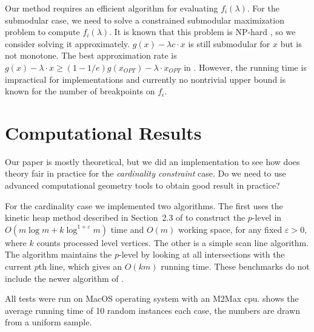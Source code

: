 \documentclass{article}
\begin{document}
Our method requires an efficient algorithm for evaluating $f_i(\lambda)$.
For the submodular case, we need to solve a constrained submodular maximization problem to compute $f_i(\lambda)$. 
It is known that this problem is NP-hard \cite{calinescu_maximizing_2011}, so we consider solving it approximately. $g(x)-\lambda c\cdot x$ is still submodular for $x$ but is not monotone. 
The best approximation rate is $g(x)-\lambda \cdot x \geq (1-1/e)g(x_{OPT})-\lambda \cdot x_{OPT}$ in \cite{sviridenko_optimal_2017}.
However, the running time is impractical for implementations and currently no nontrivial upper bound is known for the number of breakpoints on $f_i$.


\section{Computational Results}
Our paper is mostly theoretical, but we did an implementation to see how does theory fair in practice for the \emph{cardinality constraint} case. Do we need to use advanced computational geometry tools to obtain good result in practice?

For the cardinality case we implemented two algorithms. The first uses the kinetic heap method described in Section~2.3 of \cite{Chan1999RemarksOK} to construct the $p$-level in $O(m\log m+k\log^{1+\varepsilon}m)$ time and $O(m)$ working space, for any fixed $\varepsilon>0$, where $k$ counts processed level vertices. The other is a simple scan line algorithm. The algorithm maintains the $p$-level by looking at all intersections with the current $p$th line, which gives an $O(km)$ running time. These benchmarks do not include the newer algorithm of \cite{ChanChengZheng2024}.

All tests were run on MacOS operating system with an M2Max cpu. 
 shows the average running time of 10 random instances each case, the numbers are drawn from a uniform sample.
\end{document}
